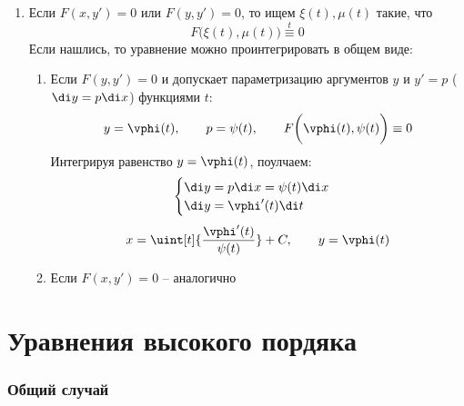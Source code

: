 \begin{enumerate}
\begin{enumerate}
\begin{multicols}{2}
            \columnbreak \\
            Надо проверить, будет ли функция $ y(x) = C $ при каких-либо $ C $ решением
        \end{multicols}
    \end{enumerate}
    \item Если $ F(x, y') = 0 $ или $ F(y, y') = 0 $, то ищем $ \xi(t), \mu(t) $ такие, что
    $$ F \bigg( \xi(t), \mu(t) \bigg) \overset{t}\equiv 0 $$
    Если нашлись, то уравнение можно проинтегрировать в общем виде:
    \begin{enumerate}
    	\item Если $ F(y, y') = 0 $ и допускает параметризацию аргументов $ y $ и $ y' = p $ ($ \di y = p\di x $) функциями $ t $:
        $$ y = \vphi(t), \qquad p = \psi(t), \qquad F \bigg( \vphi(t), \psi(t) \bigg) \equiv 0 $$
        Интегрируя равенство $ y = \vphi(t) $, поулчаем:
        $$
        \begin{cases}
            \di y = p\di x = \psi(t)\di x \\
            \di y = \vphi'(t)\di t
        \end{cases} $$
        $$ x = \uint[t]{\frac{\vphi'(t)}{\psi(t)}} + C, \qquad y = \vphi(t) $$
        \item Если $ F(x, y') = 0 $ -- аналогично
    \end{enumerate}
\end{enumerate}

\part{Уравнения высокого пордяка}

\section{Общий случай}


